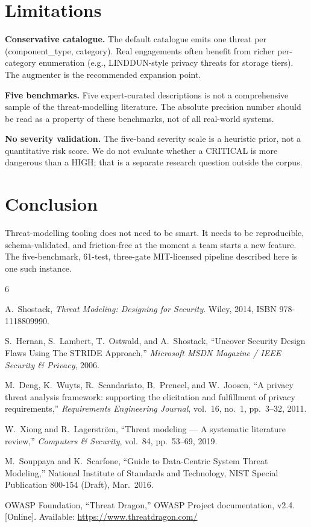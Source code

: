 \documentclass[conference]{IEEEtran}
\begin{document}
\section{Limitations}
\textbf{Conservative catalogue.} The default catalogue emits one
threat per (component\_type, category). Real engagements often
benefit from richer per-category enumeration (e.g., LINDDUN-style
privacy threats for storage tiers). The augmenter is the recommended
expansion point.

\textbf{Five benchmarks.} Five expert-curated descriptions is not a
comprehensive sample of the threat-modelling literature. The
absolute precision number should be read as a property of these
benchmarks, not of all real-world systems.

\textbf{No severity validation.} The five-band severity scale is a
heuristic prior, not a quantitative risk score. We do not evaluate
whether a CRITICAL is more dangerous than a HIGH; that is a separate
research question outside the corpus.

\section{Conclusion}
Threat-modelling tooling does not need to be smart. It needs to be
reproducible, schema-validated, and friction-free at the moment a
team starts a new feature. The five-benchmark, 61-test, three-gate
MIT-licensed pipeline described here is one such instance.


\begin{thebibliography}{6}

A.~Shostack, \emph{Threat Modeling: Designing for Security}.
Wiley, 2014, ISBN 978-1118809990.

S.~Hernan, S.~Lambert, T.~Ostwald, and A.~Shostack, ``Uncover
Security Design Flaws Using The STRIDE Approach,''
\emph{Microsoft MSDN Magazine / IEEE Security \& Privacy}, 2006.

M.~Deng, K.~Wuyts, R.~Scandariato, B.~Preneel, and W.~Joosen,
``A privacy threat analysis framework: supporting the elicitation
and fulfillment of privacy requirements,''
\emph{Requirements Engineering Journal}, vol.~16, no.~1,
pp.~3--32, 2011.

W.~Xiong and R.~Lagerstr\"om, ``Threat modeling --- A systematic
literature review,'' \emph{Computers \& Security},
vol.~84, pp.~53--69, 2019.

M.~Souppaya and K.~Scarfone, ``Guide to Data-Centric System Threat
Modeling,'' National Institute of Standards and Technology, NIST
Special Publication 800-154 (Draft), Mar.~2016.

OWASP Foundation, ``Threat Dragon,'' OWASP Project documentation,
v2.4. [Online]. Available: \url{https://www.threatdragon.com/}

\end{thebibliography}
\end{document}
